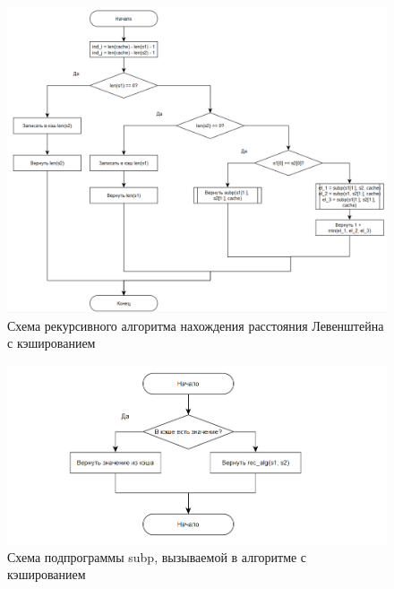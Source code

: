 \documentclass{article}
\begin{document}
\begin{figure}[h]
	\centering
	\includegraphics[scale=0.7]{tools/alg_2.png}
	\caption{Схема рекурсивного алгоритма нахождения расстояния Левенштейна с кэшированием}
	\label{fig:rec_lev_cache}
\end{figure}

\begin{figure}[h]
	\centering
	\includegraphics[scale=1.0]{tools/alg_2_subp.png}
	\caption{Схема подпрограммы subp, вызываемой в алгоритме с кэшированием}
	\label{fig:rec_lev_cache_subp}
\end{figure}
\end{document}
